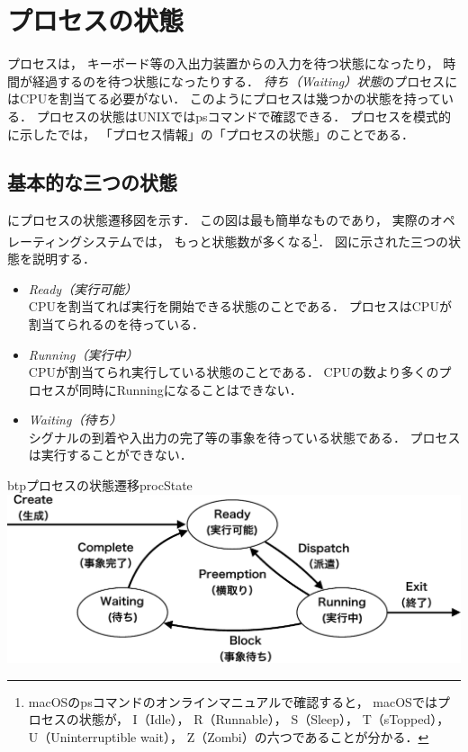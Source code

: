 \section{プロセスの状態}
\label{procState}
プロセスは，
キーボード等の入出力装置からの入力を待つ状態になったり，
時間が経過するのを待つ状態になったりする．
\emph{待ち（Waiting）状態}のプロセスにはCPUを割当てる必要がない．
このようにプロセスは幾つかの状態を持っている．
プロセスの状態はUNIXではpsコマンドで確認できる．
プロセスを模式的に示したでは，
「プロセス情報」の「プロセスの状態」のことである．

\subsection{基本的な三つの状態}
にプロセスの状態遷移図を示す．
この図は最も簡単なものであり，
実際のオペレーティングシステムでは，
もっと状態数が多くなる\footnote{
  macOSのpsコマンドのオンラインマニュアルで確認すると，
  macOSではプロセスの状態が，
  I（Idle），
  R（Runnable），
  S（Sleep），
  T（sTopped），
  U（Uninterruptible wait），
  Z（Zombi）の六つであることが分かる．}．
図に示された三つの状態を説明する．

\begin{itemize}
\item \emph{Ready（実行可能）} \\
  CPUを割当てれば実行を開始できる状態のことである．
  プロセスはCPUが割当てられるのを待っている．
\item \emph{Running（実行中）} \\
  CPUが割当てられ実行している状態のことである．
  CPUの数より多くのプロセスが同時にRunningになることはできない．
\item \emph{Waiting（待ち）} \\
  シグナルの到着や入出力の完了等の事象を待っている状態である．
  プロセスは実行することができない．
\end{itemize}

\begin{myfig}{btp}{プロセスの状態遷移}{procState}
  \includegraphics[scale=0.66]{Fig/procState-crop.pdf}
\end{myfig}

